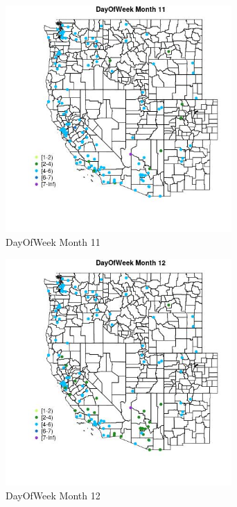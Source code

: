 \begin{figure} 
\centering  
\includegraphics[width=0.77\textwidth]{Code_Outputs/Report_ML_input_PM25_Step4_part_e_de_duplicated_aves_MapObsMo11DayOfWeek.jpg} 
\caption{\label{fig:Report_ML_input_PM25_Step4_part_e_de_duplicated_avesMapObsMo11DayOfWeek}DayOfWeek Month 11} 
\end{figure} 
 

\begin{figure} 
\centering  
\includegraphics[width=0.77\textwidth]{Code_Outputs/Report_ML_input_PM25_Step4_part_e_de_duplicated_aves_MapObsMo12DayOfWeek.jpg} 
\caption{\label{fig:Report_ML_input_PM25_Step4_part_e_de_duplicated_avesMapObsMo12DayOfWeek}DayOfWeek Month 12} 
\end{figure} 
 

